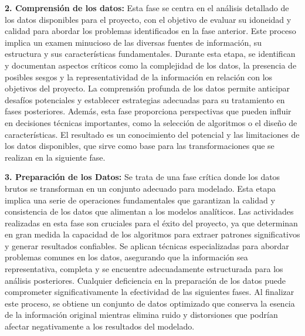 \textbf{2. Comprensión de los datos:} Esta fase se centra en el análisis detallado de los datos disponibles para el proyecto, con el objetivo de evaluar su idoneidad y calidad para abordar los problemas identificados en la fase anterior. Este proceso implica un examen minucioso de las diversas fuentes de información, su estructura y sus características fundamentales. Durante esta etapa, se identifican y documentan aspectos críticos como la complejidad de los datos, la presencia de posibles sesgos y la representatividad de la información en relación con los objetivos del proyecto. La comprensión profunda de los datos permite anticipar desafíos potenciales y establecer estrategias adecuadas para su tratamiento en fases posteriores. Además, esta fase proporciona perspectivas que pueden influir en decisiones técnicas importantes, como la selección de algoritmos o el diseño de características. El resultado es un conocimiento del potencial y las limitaciones de los datos disponibles, que sirve como base para las transformaciones que se realizan en la siguiente fase.

\textbf{3. Preparación de los Datos:} Se trata de una fase crítica donde los datos brutos se transforman en un conjunto adecuado para modelado. Esta etapa implica una serie de operaciones fundamentales que garantizan la calidad y consistencia de los datos que alimentan a los modelos analíticos. Las actividades realizadas en esta fase son cruciales para el éxito del proyecto, ya que determinan en gran medida la capacidad de los algoritmos para extraer patrones significativos y generar resultados confiables. Se aplican técnicas especializadas para abordar problemas comunes en los datos, asegurando que la información sea representativa, completa y se encuentre adecuadamente estructurada para los análisis posteriores. Cualquier deficiencia en la preparación de los datos puede comprometer significativamente la efectividad de las siguientes fases. Al finalizar este proceso, se obtiene un conjunto de datos optimizado que conserva la esencia de la información original mientras elimina ruido y distorsiones que podrían afectar negativamente a los resultados del modelado.


